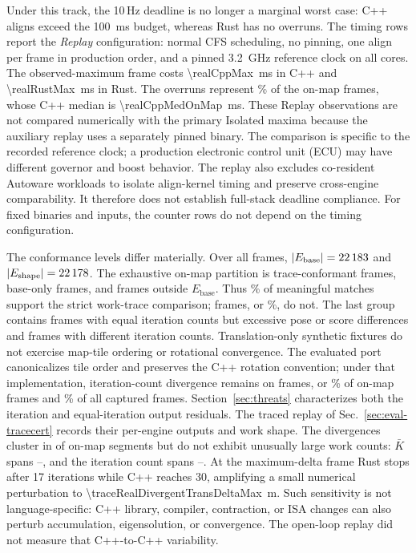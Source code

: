 Under this track, the 10\,Hz deadline is no longer a marginal worst case:
\realOverrunsCpp{} C++ aligns exceed the \SI{100}{ms} budget, whereas Rust has no
overruns. The timing rows report the \emph{Replay} configuration: normal CFS scheduling,
no pinning, one align per frame in production order, and a pinned \SI{3.2}{GHz} reference
clock on all cores. The observed-maximum frame costs \SI{\realCppMax}{ms} in C++ and
\SI{\realRustMax}{ms} in Rust. The overruns represent
\realOverrunsCppOnMapPct\% of the on-map frames, whose C++ median is
\SI{\realCppMedOnMap}{ms}. These Replay observations are not compared numerically with the
primary Isolated maxima because the auxiliary replay uses a separately pinned binary.
The comparison is specific to the recorded reference clock; a production electronic control unit (ECU) may have
different governor and boost behavior. The replay also excludes co-resident Autoware
workloads to isolate align-kernel timing and preserve cross-engine comparability. It
therefore does not establish full-stack deadline compliance. For fixed binaries and inputs, the counter rows do not depend on the timing
configuration.

The conformance levels differ materially. Over all frames,
$|E_{\mathrm{base}}|=\num{22183}{}$ and
$|E_{\mathrm{shape}}|=\num{22178}{}$. The exhaustive on-map partition is
\realShapeOnMap{} trace-conformant frames, \realBaseOnly{} base-only frames, and
\realBaseDivergent{} frames outside $E_{\mathrm{base}}$. Thus
\realShapeOnMapPct\% of meaningful matches support the strict work-trace comparison;
\realNotShapeOnMap{} frames, or \realNotShapeOnMapPct\%, do not. The last group contains
\realOutputDivergent{} frames with equal iteration counts but excessive pose or score
differences and \realIterationDivergent{} frames with different iteration counts.
Translation-only synthetic fixtures do not exercise map-tile ordering or rotational
convergence. The evaluated port canonicalizes tile order and preserves the C++ rotation
convention; under that implementation, iteration-count divergence remains on
\realIterationDivergent{} frames, or \realOnMapDivPct\% of on-map frames and
\realDivPctAll\% of all captured frames. Section~\ref{sec:threats} characterizes both
the iteration and equal-iteration output residuals. The traced replay of
Sec.~\ref{sec:eval-tracecert} records their per-engine outputs and work shape.
The \realIterationDivergent{} divergences cluster in \realDivSegments{} of
\realSegments{} on-map segments but do not exhibit unusually large work counts:
$\bar{K}$ spans \realDivKbarMin{}--\realDivKbarMax{}, and the iteration count spans
\realDivIterMin--\realDivIterMax{}.
At the maximum-delta frame Rust stops after 17 iterations while C++ reaches 30, amplifying
a small numerical perturbation to \SI{\traceRealDivergentTransDeltaMax}{m}. Such sensitivity
is not language-specific: C++ library, compiler, contraction, or ISA changes can also perturb
accumulation, eigensolution, or convergence. The open-loop replay did not measure that
C++-to-C++ variability.

